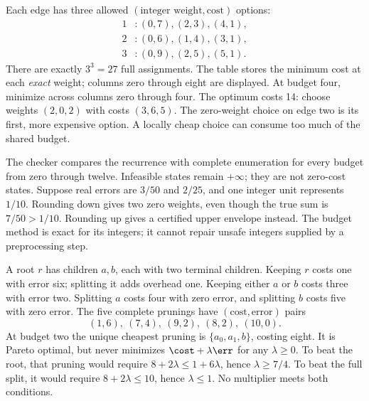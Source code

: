 Each edge has three allowed $(\text{integer weight},\text{cost})$ options:
\[
\begin{aligned}
1 &: (0,7),(2,3),(4,1),\\
2 &: (0,6),(1,4),(3,1),\\
3 &: (0,9),(2,5),(5,1).
\end{aligned}
\]
There are exactly $3^3=27$ full assignments. The table stores the minimum cost at each \emph{exact} weight; columns zero through eight are displayed.
At budget four, minimize across columns zero through four. The optimum costs 14: choose weights $(2,0,2)$ with costs $(3,6,5)$. The zero-weight choice on edge two is its first, more expensive option. A locally cheap choice can consume too much of the shared budget.

The checker compares the recurrence with complete enumeration for every budget from zero through twelve. Infeasible states remain $+\infty$; they are not zero-cost states.
Suppose real errors are $3/50$ and $2/25$, and one integer unit represents $1/10$. Rounding down gives two zero weights, even though the true sum is $7/50>1/10$. Rounding up gives a certified upper envelope instead. The budget method is exact for its integers; it cannot repair unsafe integers supplied by a preprocessing step.

A root $r$ has children $a,b$, each with two terminal children. Keeping $r$ costs one with error six; splitting it adds overhead one. Keeping either $a$ or $b$ costs three with error two. Splitting $a$ costs four with zero error, and splitting $b$ costs five with zero error.
The five complete prunings have $(\text{cost},\text{error})$ pairs
\[
(1,6),\ (7,4),\ (9,2),\ (8,2),\ (10,0).
\]
At budget two the unique cheapest pruning is $\{a_0,a_1,b\}$, costing eight. It is Pareto optimal, but never minimizes $\cost+\lambda\err$ for any $\lambda\ge0$.
To beat the root, that pruning would require $8+2\lambda\le1+6\lambda$, hence $\lambda\ge7/4$. To beat the full split, it would require $8+2\lambda\le10$, hence $\lambda\le1$. No multiplier meets both conditions.

